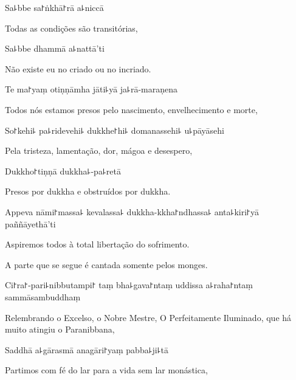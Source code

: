 Sa꜕bbe sa꜓ṅkhā꜓rā a꜕niccā

\begin{english}
  Todas as condições são transitórias,
\end{english}

Sa꜕bbe dhammā a꜕nattā'ti

\begin{english}
  Não existe eu no criado ou no incriado.
\end{english}

Te ma꜓yaṃ otiṇṇāmha jāti꜕yā ja꜕rā-maraṇena

\begin{english}
  Todos nós estamos presos pelo nascimento, envelhecimento e morte,
\end{english}

So꜓kehi꜕ pa꜕ridevehi꜕ dukkhe꜓hi꜕ domanassehi꜕ u꜕pāyāsehi

\begin{english}
  Pela tristeza, lamentação, dor, mágoa e desespero,
\end{english}

Dukkho꜓tiṇṇā dukkha꜕-pa꜕retā

\begin{english}
  Presos por dukkha e obstruídos por dukkha.
\end{english}

Appeva nāmi꜓massa꜕ kevalassa꜕ dukkha-kkha꜓ndhassa꜕ anta꜕kiri꜓yā \\paññāyethā'ti

\begin{english}
  Aspiremos todos à total libertação do sofrimento.
\end{english}

\begin{instruction}
  A parte que se segue é cantada somente pelos monges.
\end{instruction}

Ci꜓ra꜓-pari꜕nibbutampi꜓ taṃ bha꜕gava꜓ntaṃ uddissa a꜕raha꜓ntaṃ sammāsambuddhaṃ

\begin{english}
  Relembrando o Excelso, o Nobre Mestre, O Perfeitamente Iluminado, que há muito atingiu o Paranibbana,
\end{english}

Saddhā a꜕gārasmā anagāri꜓yaṃ pabba꜕ji꜕tā

\begin{english}
  Partimos com fé do lar para a vida sem lar monástica,
\end{english}

